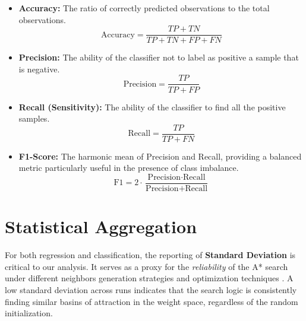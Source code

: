 \begin{itemize}
    \item \textbf{Accuracy:} The ratio of correctly predicted observations to the total observations.
    $$ \text{Accuracy} = \frac{TP + TN}{TP + TN + FP + FN} $$

    \item \textbf{Precision:} The ability of the classifier not to label as positive a sample that is negative.
    $$ \text{Precision} = \frac{TP}{TP + FP} $$

    \item \textbf{Recall (Sensitivity):} The ability of the classifier to find all the positive samples.
    $$ \text{Recall} = \frac{TP}{TP + FN} $$

    \item \textbf{F1-Score:} The harmonic mean of Precision and Recall, providing a balanced metric particularly useful in the presence of class imbalance.
    $$ \text{F1} = 2 \cdot \frac{\text{Precision} \cdot \text{Recall}}{\text{Precision} + \text{Recall}} $$
\end{itemize}


\section{Statistical Aggregation}
For both regression and classification, the reporting of \textbf{Standard Deviation} is critical to our analysis. It serves as a proxy for the \textit{reliability} of the A* search under different neighbors generation strategies and optimization techniques . A low standard deviation across runs indicates that the search logic is consistently finding similar basins of attraction in the weight space, regardless of the random initialization.

